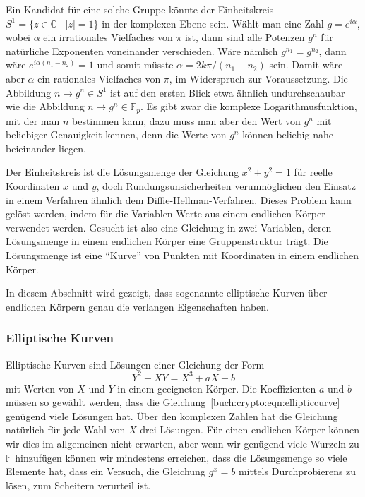 Ein Kandidat für eine solche Gruppe könnte der Einheitskreis
$S^1=\{z\in\mathbb{C}\;|\; |z|=1\}$ in der komplexen Ebene sein.
Wählt man eine Zahl $g=e^{i\alpha}$, wobei $\alpha$ ein irrationales
Vielfaches von $\pi$ ist, dann sind alle Potenzen $g^n$ für natürliche
Exponenten voneinander verschieden.
Wäre nämlich $g^{n_1}=g^{n_2}$, dann wäre $e^{i\alpha(n_1-n_2)}=1$ und
somit müsste $\alpha=2k\pi/(n_1-n_2)$ sein.
Damit wäre aber $\alpha$ ein rationales Vielfaches von $\pi$, im Widerspruch
zur Voraussetzung.
Die Abbildung $n\mapsto g^n\in S^1$ ist auf den ersten Blick etwa ähnlich
undurchschaubar wie die Abbildung $n\mapsto g^n\in\mathbb{F}_p$.
Es gibt zwar die komplexe Logarithmusfunktion, mit der man $n$ bestimmen
kann, dazu muss man aber den Wert von $g^n$ mit beliebiger Genauigkeit
kennen, denn die Werte von $g^n$ können beliebig nahe beieinander liegen.

Der Einheitskreis ist die Lösungsmenge der Gleichung $x^2+y^2=1$ für
reelle Koordinaten $x$ und $y$,
doch Rundungsunsicherheiten verunmöglichen den Einsatz in einem 
Verfahren ähnlich dem Diffie-Hellman-Verfahren.
Dieses Problem kann gelöst werden, indem für die Variablen Werte
aus einem endlichen Körper verwendet werden.
Gesucht ist also eine Gleichung in zwei Variablen, deren Lösungsmenge
in einem endlichen Körper eine Gruppenstruktur trägt.
Die Lösungsmenge ist eine ``Kurve'' von Punkten mit
Koordinaten in einem endlichen Körper.

In diesem Abschnitt wird gezeigt, dass sogenannte elliptische Kurven
über endlichen Körpern genau die verlangen Eigenschaften haben.

\subsubsection{Elliptische Kurven}
Elliptische Kurven sind Lösungen einer Gleichung der Form
\begin{equation}
Y^2+XY=X^3+aX+b
\label{buch:crypto:eqn:ellipticcurve}
\end{equation}
mit Werten von $X$ und $Y$ in einem geeigneten Körper.
Die Koeffizienten $a$ und $b$ müssen so gewählt werden, dass die
Gleichung~\eqref{buch:crypto:eqn:ellipticcurve} genügend viele
Lösungen hat.
Über den komplexen Zahlen hat die Gleichung natürlich für jede Wahl von
$X$ drei Lösungen.
Für einen endlichen Körper können wir dies im allgemeinen nicht erwarten,
aber wenn wir genügend viele Wurzeln zu $\mathbb{F}$ hinzufügen können wir
mindestens erreichen, dass die Lösungsmenge so viele Elemente hat, 
dass ein Versuch, die Gleichung $g^x=b$ mittels Durchprobierens zu
lösen, zum Scheitern verurteil ist.


